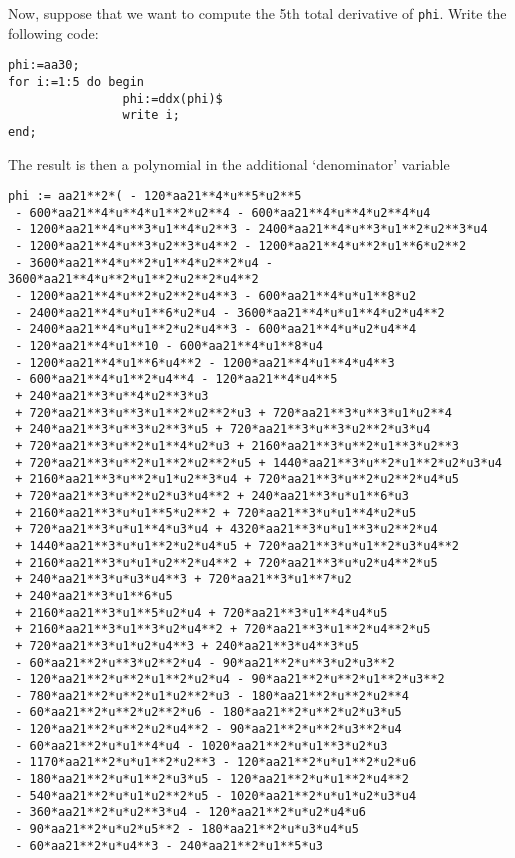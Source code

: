 Now, suppose that we want to compute the 5th total derivative of
\texttt{phi}. Write the following code:
\begin{verbatim}
phi:=aa30;
for i:=1:5 do begin
                phi:=ddx(phi)$
                write i;
end;
\end{verbatim}
The result is then a polynomial in the additional `denominator' variable
\begin{verbatim}
phi := aa21**2*( - 120*aa21**4*u**5*u2**5
 - 600*aa21**4*u**4*u1**2*u2**4 - 600*aa21**4*u**4*u2**4*u4
 - 1200*aa21**4*u**3*u1**4*u2**3 - 2400*aa21**4*u**3*u1**2*u2**3*u4
 - 1200*aa21**4*u**3*u2**3*u4**2 - 1200*aa21**4*u**2*u1**6*u2**2
 - 3600*aa21**4*u**2*u1**4*u2**2*u4 - 3600*aa21**4*u**2*u1**2*u2**2*u4**2
 - 1200*aa21**4*u**2*u2**2*u4**3 - 600*aa21**4*u*u1**8*u2
 - 2400*aa21**4*u*u1**6*u2*u4 - 3600*aa21**4*u*u1**4*u2*u4**2
 - 2400*aa21**4*u*u1**2*u2*u4**3 - 600*aa21**4*u*u2*u4**4
 - 120*aa21**4*u1**10 - 600*aa21**4*u1**8*u4
 - 1200*aa21**4*u1**6*u4**2 - 1200*aa21**4*u1**4*u4**3
 - 600*aa21**4*u1**2*u4**4 - 120*aa21**4*u4**5
 + 240*aa21**3*u**4*u2**3*u3
 + 720*aa21**3*u**3*u1**2*u2**2*u3 + 720*aa21**3*u**3*u1*u2**4
 + 240*aa21**3*u**3*u2**3*u5 + 720*aa21**3*u**3*u2**2*u3*u4
 + 720*aa21**3*u**2*u1**4*u2*u3 + 2160*aa21**3*u**2*u1**3*u2**3
 + 720*aa21**3*u**2*u1**2*u2**2*u5 + 1440*aa21**3*u**2*u1**2*u2*u3*u4
 + 2160*aa21**3*u**2*u1*u2**3*u4 + 720*aa21**3*u**2*u2**2*u4*u5
 + 720*aa21**3*u**2*u2*u3*u4**2 + 240*aa21**3*u*u1**6*u3
 + 2160*aa21**3*u*u1**5*u2**2 + 720*aa21**3*u*u1**4*u2*u5
 + 720*aa21**3*u*u1**4*u3*u4 + 4320*aa21**3*u*u1**3*u2**2*u4
 + 1440*aa21**3*u*u1**2*u2*u4*u5 + 720*aa21**3*u*u1**2*u3*u4**2
 + 2160*aa21**3*u*u1*u2**2*u4**2 + 720*aa21**3*u*u2*u4**2*u5
 + 240*aa21**3*u*u3*u4**3 + 720*aa21**3*u1**7*u2
 + 240*aa21**3*u1**6*u5
 + 2160*aa21**3*u1**5*u2*u4 + 720*aa21**3*u1**4*u4*u5
 + 2160*aa21**3*u1**3*u2*u4**2 + 720*aa21**3*u1**2*u4**2*u5
 + 720*aa21**3*u1*u2*u4**3 + 240*aa21**3*u4**3*u5
 - 60*aa21**2*u**3*u2**2*u4 - 90*aa21**2*u**3*u2*u3**2
 - 120*aa21**2*u**2*u1**2*u2*u4 - 90*aa21**2*u**2*u1**2*u3**2
 - 780*aa21**2*u**2*u1*u2**2*u3 - 180*aa21**2*u**2*u2**4
 - 60*aa21**2*u**2*u2**2*u6 - 180*aa21**2*u**2*u2*u3*u5
 - 120*aa21**2*u**2*u2*u4**2 - 90*aa21**2*u**2*u3**2*u4
 - 60*aa21**2*u*u1**4*u4 - 1020*aa21**2*u*u1**3*u2*u3
 - 1170*aa21**2*u*u1**2*u2**3 - 120*aa21**2*u*u1**2*u2*u6
 - 180*aa21**2*u*u1**2*u3*u5 - 120*aa21**2*u*u1**2*u4**2
 - 540*aa21**2*u*u1*u2**2*u5 - 1020*aa21**2*u*u1*u2*u3*u4
 - 360*aa21**2*u*u2**3*u4 - 120*aa21**2*u*u2*u4*u6
 - 90*aa21**2*u*u2*u5**2 - 180*aa21**2*u*u3*u4*u5
 - 60*aa21**2*u*u4**3 - 240*aa21**2*u1**5*u3

\end{verbatim}
